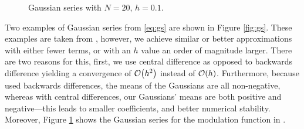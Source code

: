 \begin{figure}[tbp]

\caption[Gaussian series for a particular modulation function.]{Gaussian series with $N = 20$, $h = 0.1$.}
\label{fig:gaussmod}
\end{figure}

Two examples of Gaussian series from \eqref{eq:gs} are shown in Figure \ref{fig:gs}. These examples are taken from \cite{calcaterra2, calcaterra}, however, we achieve similar or better approximations with either fewer terms, or with an $h$ value an order of magnitude larger. There are two reasons for this, first, we use central difference as opposed to backwards difference yielding a convergence of $\bigO{h^2}$ instead of $\bigO{h}$. Furthermore, because \cite{calcaterra2, calcaterra} used backwards differences, the means of the Gaussians are all non-negative, whereas with central differences, our Gaussians' means are both positive and negative---this leads to smaller coefficients, and better numerical stability. Moreover, Figure \ref{fig:gaussmod} shows the Gaussian series for the modulation function in \cite{bohun, burgoyneemail}.


